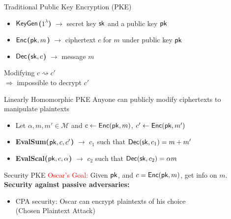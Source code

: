 \begin{frame}{Traditional Public Key Encryption (PKE)}
\begin{itemize}
\item \textcolor{mLightBrown}{\textbf{$\mathsf{KeyGen}$($1^\lambda$)}} $\rightarrow$ secret key $\mathsf{sk}$ and a public key $\mathsf{pk}$
\item \textcolor{mLightBrown}{\textbf{$\mathsf{Enc}$($\mathsf{pk},m$)}} $\rightarrow$ ciphertext $c$ for $m$ under public key $\mathsf{pk}$
\item \textcolor{mLightBrown}{\textbf{$\mathsf{Dec}$($\mathsf{sk},c$)}} $\rightarrow$ message $m$
\end{itemize}
Modifying $c \rightsquigarrow c'$ \\
\hspace{1cm} $\Rightarrow$ impossible to decrypt $c'$
\end{frame}

\begin{frame}{Linearly Homomorphic PKE}
Anyone can publicly modify ciphertexts to manipulate plaintexts
\begin{itemize}
\item Let $\alpha, m, m'\in \mathcal{M}$ and $c \gets \mathsf{Enc}(\mathsf{pk},m)$, $c'\gets \mathsf{Enc}(\mathsf{pk}, m')$
\item \textcolor{mLightBrown}{\textbf{EvalSum($\mathsf{pk}, c, c'$)}} $\rightarrow$ $c_1$ such that $\mathsf{Dec}(\mathsf{sk},c_1)=m+m'$
\item \textcolor{mLightBrown}{\textbf{EvalScal($\mathsf{pk}, c, \alpha$)}} $\rightarrow$ $c_2$ such that $\mathsf{Dec}(\mathsf{sk},c_2)=\alpha m$
\end{itemize}
\end{frame}

\begin{frame}{Security PKE}
\textcolor{red}{Oscar's Goal:} Given $\mathsf{pk}$, and $c=\mathsf{Enc}(\mathsf{pk},m)$, get info on $m$.
\textcolor{darkjunglegreen}{\textbf{Security against passive adversaries:}}
\begin{itemize}
\item CPA security: Oscar can encrypt plaintexts of his choice \\(Chosen Plaintext Attack)
\end{itemize}
\end{frame}

